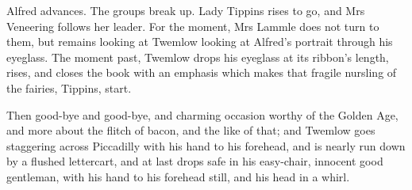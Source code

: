 Alfred advances. The groups break up. Lady Tippins rises to go, and Mrs
Veneering follows her leader. For the moment, Mrs Lammle does not turn
to them, but remains looking at Twemlow looking at Alfred’s portrait
through his eyeglass. The moment past, Twemlow drops his eyeglass at its
ribbon’s length, rises, and closes the book with an emphasis which makes
that fragile nursling of the fairies, Tippins, start.

Then good-bye and good-bye, and charming occasion worthy of the Golden
Age, and more about the flitch of bacon, and the like of that; and
Twemlow goes staggering across Piccadilly with his hand to his forehead,
and is nearly run down by a flushed lettercart, and at last drops
safe in his easy-chair, innocent good gentleman, with his hand to his
forehead still, and his head in a whirl.






